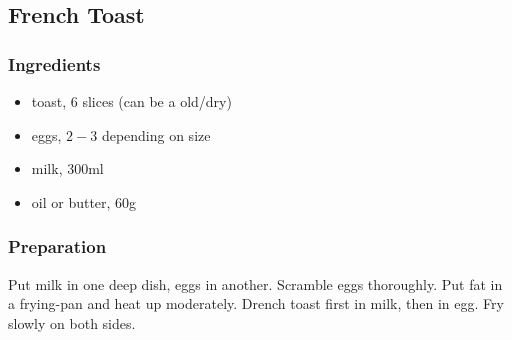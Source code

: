 \subsection{French Toast}
\subsubsection{Ingredients}
\begin{itemize}
\item{toast, 6 slices (can be a old/dry)}
\item{eggs, $2-3$ depending on size}
\item{milk, 300ml}
\item{oil or butter, 60g}
\end{itemize}
\subsubsection{Preparation}
Put milk in one deep dish, eggs in another. Scramble eggs thoroughly. Put fat in a frying-pan and heat up moderately. Drench toast first in milk, then in egg. Fry slowly on both sides.  
